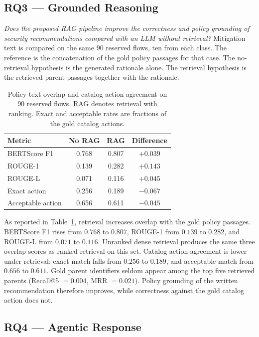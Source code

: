 \documentclass[10pt, conference]{IEEEtran}
\begin{document}
\subsection{RQ3 --- Grounded Reasoning}
\label{sec:rq3}

\textit{Does the proposed RAG pipeline improve the correctness and policy grounding of security recommendations compared with an LLM without retrieval?}
Mitigation text is compared on the same $90$ reserved flows, ten from each class. The reference is the concatenation of the gold policy passages for that case. The no-retrieval hypothesis is the generated rationale alone. The retrieval hypothesis is the retrieved parent passages together with the rationale.

\begin{table}[t]
\centering
\caption{Policy-text overlap and catalog-action agreement on $90$ reserved flows. RAG denotes retrieval with ranking. Exact and acceptable rates are fractions of the gold catalog actions.}
\label{tab:rag90}
\renewcommand{\arraystretch}{1.15}
\begin{tabular}{@{}lccc@{}}
\toprule
\textbf{Metric} & \textbf{No RAG} & \textbf{RAG} & \textbf{Difference}\\
\midrule
BERTScore F1 & 0.768 & 0.807 & $+0.039$\\
ROUGE-1      & 0.139 & 0.282 & $+0.143$\\
ROUGE-L      & 0.071 & 0.116 & $+0.045$\\
Exact action & 0.256 & 0.189 & $-0.067$\\
Acceptable action & 0.656 & 0.611 & $-0.045$\\
\bottomrule
\end{tabular}
\end{table}

As reported in Table~\ref{tab:rag90}, retrieval increases overlap with the gold policy passages. BERTScore F1 rises from $0.768$ to $0.807$, ROUGE-1 from $0.139$ to $0.282$, and ROUGE-L from $0.071$ to $0.116$. Unranked dense retrieval produces the same three overlap scores as ranked retrieval on this set. Catalog-action agreement is lower under retrieval: exact match falls from $0.256$ to $0.189$, and acceptable match from $0.656$ to $0.611$. Gold parent identifiers seldom appear among the top five retrieved parents (Recall@5 ${=}0.004$, MRR ${=}0.021$). Policy grounding of the written recommendation therefore improves, while correctness against the gold catalog action does not.

\subsection{RQ4 --- Agentic Response}
\label{sec:rq4}
\end{document}

